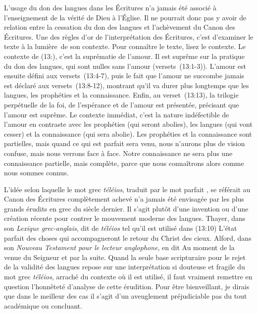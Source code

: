 L'usage du don des langues dans les Écritures n'a jamais été associé
 à l'enseignement de la vérité de Dieu à l'Église.
 Il ne pourrait donc pas y avoir de relation entre la cessation
 du don des langues et l'achèvement du Canon des Écritures.
 Une des règles d'or de l'interprétation des Écritures, c'est d'examiner
 le texte à la lumière~de son contexte. Pour connaître le texte,
 lisez le contexte. Le contexte de (13:), c'est la suprématie
 de l'amour. Il est suprême sur la pratique du don des langues,
 qui sont nulles sans l'amour (versets~(13:1-3)).
 L'amour est ensuite défini aux versets~(13:4-7),
 puis le fait que l'amour ne succombe jamais est déclaré aux
 versets~(13:8-12), montrant qu'il va durer plus longtemps
 que les langues, les prophéties et la connaissance.
 Enfin, au verset~(13:13), la trilogie perpétuelle de la foi,
 de l'espérance et de l'amour est présentée, précisant que l'amour
 est suprême. Le contexte immédiat, c'est la nature indéfectible de l'amour
 en contraste avec les prophéties (qui seront abolies), les langues
 (qui vont cesser) et la connaissance (qui sera abolie).
 Les prophéties et la connaissance sont partielles, mais quand ce qui
 est parfait sera venu, nous n'aurons plus de vision confuse,
 mais nous verrons face à face. Notre connaissance ne sera plus
 une connaissance partielle, mais complète, parce que nous connaîtrons
 alors comme nous sommes connus.

L'idée selon laquelle le mot grec \emph{téléios}, traduit par le mot \Og parfait \Fg{},
 se référait au Canon des Écritures complètement achevé n'a jamais été envisagée par
 les plus grands érudits en grec du siècle dernier.
 Il s'agit plutôt d'une invention ou d'une création récente pour contrer
 le mouvement moderne des langues. Thayer, dans son
 \emph{Lexique grec-anglais},
 dit de \emph{téléios} tel qu'il est utilisé dans (13:10)\frcolon{}
 \Og L'état parfait des choses qui accompagneront le retour du Christ
 des cieux. \Fg{} Alford, dans son \emph{Nouveau Testament pour le lecteur
 anglophone}, en dit\frcolon{} \Og Au moment de la venue du Seigneur et par la suite. \Fg{}
 Quand la seule base scripturaire pour le rejet de la validité des langues
 repose sur une interprétation si douteuse et fragile du mot grec
 \emph{téléios}, arraché du contexte où il est utilisé, il faut vraiment
 remettre en question l'honnêteté d'analyse de cette érudition.
 Pour être bienveillant, je dirais que dans le meilleur des cas il s'agit
 d'un aveuglement préjudiciable \ocadr pas du tout académique ou concluant.

